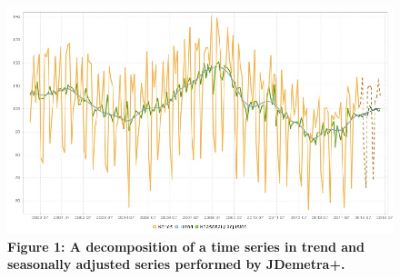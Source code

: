 \documentclass{article}
\begin{document}
\begin{figure}[H]
  \includegraphics[width=\linewidth]{../images/capitolo1/intro.jpg}
  {\textbf{\scriptsize Figure 1: A decomposition of a time series in trend and seasonally adjusted series performed by JDemetra+.}}
\end{figure}
\end{document}
